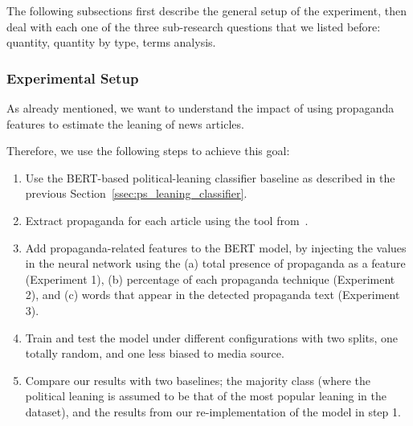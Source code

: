 The following subsections first describe the general setup of the experiment, then deal with each one of the three sub-research questions that we listed before: quantity, quantity by type, terms analysis.%




\subsubsection{Experimental Setup}
As already mentioned, we want to understand the impact of using propaganda features to estimate the leaning of news articles.

Therefore, we use the following steps to achieve this goal:
\begin{enumerate}
    \item Use the BERT-based political-leaning classifier baseline as described in the previous Section~\ref{ssec:ps_leaning_classifier}. %
    \item Extract propaganda for each article using the tool from~\citet{da2019fine}.
    \item Add propaganda-related features to the BERT model, by injecting the values in the neural network using the (a) total presence of propaganda as a feature (Experiment 1), (b) percentage of each propaganda technique (Experiment 2), and (c) words that appear in the detected propaganda text (Experiment 3).
    \item Train and test the model under different configurations with two splits, one totally random, and one less biased to media source.
    \item Compare our results with two baselines; the majority class (where the political leaning is assumed to be that of the most popular leaning in the dataset), and the results from our re-implementation of the model in step 1. %
\end{enumerate}


